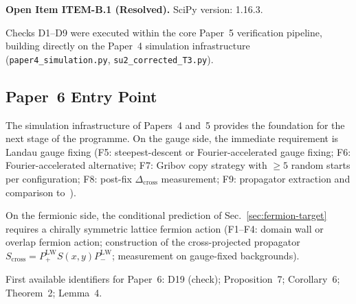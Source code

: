 \documentclass[12pt]{article}
\numberwithin{equation}{section}
\theoremstyle{plain}
\theoremstyle{definition}
\theoremstyle{remark}
\newcommand{\Dcross}{\Delta_{\mathrm{cross}}}  %
\newcommand{\PLW}{P^{\mathrm{LW}}}         %
\begin{document}
		\medskip\noindent
		\textbf{Open Item ITEM-B.1 (Resolved).}\enspace
		SciPy version: 1.16.3.
		
		\medskip\noindent
		Checks D1--D9 were executed within the core Paper~5 verification
		pipeline, building directly on the Paper~4 simulation infrastructure
		(\texttt{paper4\_simulation.py}, \texttt{su2\_corrected\_T3.py}).
		
		\subsection{Paper~6 Entry Point}
		\label{sec:paper6-entry}
		
		The simulation infrastructure of Papers~4 and~5 provides the
		foundation for the next stage of the programme.  On the gauge side,
		the immediate requirement is Landau gauge fixing (F5:
		steepest-descent or Fourier-accelerated gauge fixing; F6:
		Fourier-accelerated alternative; F7: Gribov copy strategy with
		$\geq 5$ random starts per configuration; F8: post-fix $\Dcross$
		measurement; F9: propagator extraction and comparison
		to~\cite{CucchieriMendes2008,Bogolubsky}).
		
		On the fermionic side, the conditional prediction of
		Sec.~\ref{sec:fermion-target} requires a chirally symmetric lattice
		fermion action (F1--F4: domain wall or overlap fermion action;
		construction of the cross-projected propagator
		$S_{\mathrm{cross}} = \PLW_+ S(x,y) \PLW_-$; measurement on
		gauge-fixed backgrounds).
		
		First available identifiers for Paper~6: D19 (check); Proposition~7;
		Corollary~6; Theorem~2; Lemma~4.
		
		
\end{document}
